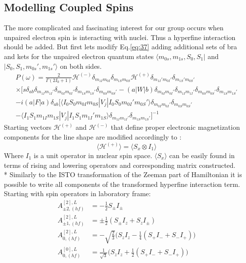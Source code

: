 \subsection{Modelling Coupled Spins}\label{coupledspinsection}
The more complicated and fascinating interest for our group occurs when unpaired electron spin is interacting with nuclei. Thus a hyperfine interaction should be added. But first lets modify Eq.\ref{eq:37} adding additional sets of bra and kets for the unpaired electron quantum states $\langle m_{0s},m_{1s},S_0,S_1|$ and $|S_0,S_1,m_{0s}',m_{1s}'\rangle$ on both sides.  
\begin{multline}\label{eq:newbras}
P(\omega)=
\frac{2}{\Gamma(2I_0+1)}\mathcal{H}^{(-)}\delta_{m_{1I}m_{0I}}\delta_{m_{1S}m_{0S}}\mathcal{H}^{(+)}\delta_{m_{1I}'m_{0I}'}\delta_{m_{1S}'m_{0S}'} \\ \times[s\delta_{ab}\delta_{m_{1I}m_{1I}'}\delta_{m_{0I}m_{0I}'}\delta_{m_{1S}m_{1S}'}\delta_{m_{0S}m_{0S}'}-(a|W|b)\delta_{m_{0I}m_{0I}'}\delta_{m_{1I}m_{1I}'}\delta_{m_{0S}m_{0S}'}\delta_{m_{1S}m_{1S}'} \\ -i(a|F|a)\delta_{ab}[\langle I_0S_0m_{0I}m_{0S}|V_j|I_0S_0m_{0I}'m_{0S}'\rangle \delta_{m_{0I}m_{0I}'}\delta_{m_{0S}m_{0S}'}\\-\langle I_1S_1m_{1I}m_{1S}|V_j|I_1S_1m_{1I}'m_{1S}\rangle\delta_{m_{1I}m_{1I}'}\delta_{m_{1S}m_{1S}'}]^{-1}
\end{multline} 
Starting vectors $\mathcal{H}^{(+)}$ and $\mathcal{H}^{(-)}$ that define proper electronic magnetization components for the line shape are modified accordingly to \cite{bmr}: 
\begin{equation}
\langle \mathcal{H}^{(+)} \rangle=\langle S_x\otimes I_1 \rangle
\end{equation}
Where $I_1$ is a unit operator in nuclear spin space. $\langle S_x\rangle$ can be easily found in terms of rising and lowering operators and corresponding matrix constructed. \\*
Similarly to the ISTO transformation of the Zeeman part of Hamiltonian it is possible to write all components of the transformed hyperfine interaction term. Starting with spin operators in laboratory frame:   
\begin{subequations}\label{eq:hyperA}
\begin{align}
A^{[2],L}_{\pm2,(hf)} & =-\frac{1}{2}S_{\pm}I_{\pm}\\
A^{[2],L}_{\pm1,(hf)} & =\pm\frac{1}{2}(S_{\pm}I_{z}+S_zI_{\pm})\\
A^{[2],L}_{0,(hf)} & =-\sqrt{\frac{2}{3}}\big(S_{z}I_{z}-\frac{1}{4}(S_+I_-+S_-I_+)\big)\\
A^{[0],L}_{0,(hf)} & =\frac{1}{\sqrt{3}}\big(S_{z}I_{z}+\frac{1}{2}(S_+I_-+S_-I_+)\big)
\end{align}
\end{subequations}
